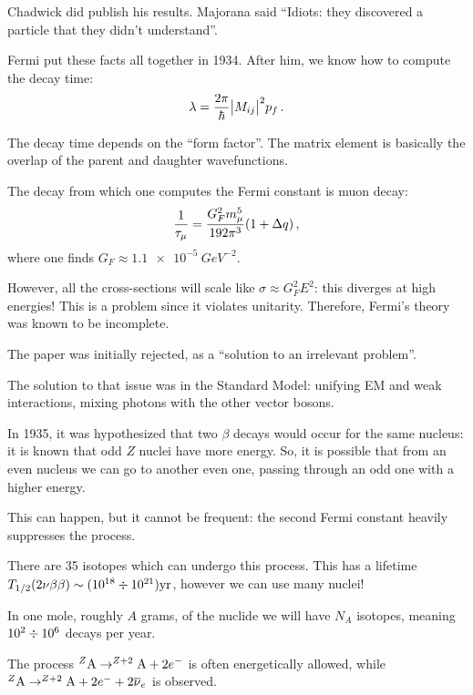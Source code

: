 \documentclass[main.tex]{subfiles}
\begin{document}
Chadwick did publish his results. 
Majorana said ``Idiots: they discovered a particle that they didn't understand''.

Fermi put these facts all together in 1934. 
After him, we know how to compute the decay time: 
%
\begin{align}
\lambda = \frac{2 \pi }{\hbar} \abs{M_{ij}}^2 p_f
\,.
\end{align}

The decay time depends on the ``form factor''. 
The matrix element is basically the overlap of the parent and daughter wavefunctions. 

The decay from which one computes the Fermi constant is muon decay: 
%
\begin{align}
\frac{1}{\tau _\mu } = \frac{G_F^2 m_\mu^{5}}{192 \pi^3} \qty(1 + \Delta q)
\,,
\end{align}
%
where one finds \(G_F \approx \SI{1.1e-5}{GeV^{-2}}\). 

However, all the cross-sections will scale like \(\sigma \approx G_F^2E^2\): 
this diverges at high energies! 
This is a problem since it violates unitarity. 
Therefore, Fermi's theory was known to be incomplete. 

The paper was initially rejected, as a ``solution to an irrelevant problem''. 

The solution to that issue was in the Standard Model: unifying EM and weak interactions, 
mixing photons with the other vector bosons. 

In 1935, it was hypothesized that two \(\beta \) decays would occur for the same nucleus: 
it is known that odd \(Z\) nuclei have more energy. 
So, it is possible that from an even nucleus we can go to another even one, 
passing through an odd one with a higher energy. 

This can happen, but it cannot be frequent: the second Fermi constant 
heavily suppresses the process. 

There are 35 isotopes which can undergo this process. 
This has a lifetime \(T_{1/2}  (2 \nu \beta \beta ) \sim (\num{e18} \divisionsymbol \num{e21}) \SI{}{yr}\),
however we can use many nuclei! 

In one mole, roughly \(A\) grams, of the nuclide we will have \(N_A\) isotopes, meaning \(\num{e2} \divisionsymbol \num{e6}\) decays per year.

The process \(^{Z} \ce{A} \to ^{Z+2} \ce{A} + 2 e^{-}\) is often energetically allowed, 
while \(^{Z} \ce{A} \to ^{Z+2}\ce{A} + 2 e^{-} + 2 \overline{\nu}_e\) is observed. 
\end{document}
